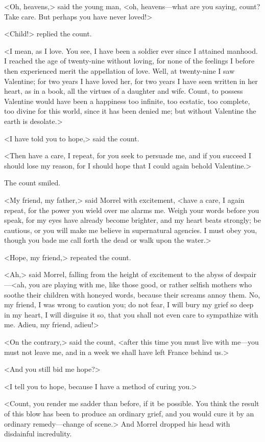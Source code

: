  <Oh, heavens,> said the young man, <oh, heavens—what are you saying, count? Take care. But perhaps you have never loved!> 

 <Child!> replied the count. 

 <I mean, as I love. You see, I have been a soldier ever since I attained manhood. I reached the age of twenty-nine without loving, for none of the feelings I before then experienced merit the appellation of love. Well, at twenty-nine I saw Valentine; for two years I have loved her, for two years I have seen written in her heart, as in a book, all the virtues of a daughter and wife. Count, to possess Valentine would have been a happiness too infinite, too ecstatic, too complete, too divine for this world, since it has been denied me; but without Valentine the earth is desolate.> 

 <I have told you to hope,> said the count. 

 <Then have a care, I repeat, for you seek to persuade me, and if you succeed I should lose my reason, for I should hope that I could again behold Valentine.> 

 The count smiled. 

 <My friend, my father,> said Morrel with excitement, <have a care, I again repeat, for the power you wield over me alarms me. Weigh your words before you speak, for my eyes have already become brighter, and my heart beats strongly; be cautious, or you will make me believe in supernatural agencies. I must obey you, though you bade me call forth the dead or walk upon the water.> 

 <Hope, my friend,> repeated the count. 

 <Ah,> said Morrel, falling from the height of excitement to the abyss of despair—<ah, you are playing with me, like those good, or rather selfish mothers who soothe their children with honeyed words, because their screams annoy them. No, my friend, I was wrong to caution you; do not fear, I will bury my grief so deep in my heart, I will disguise it so, that you shall not even care to sympathize with me. Adieu, my friend, adieu!> 

 <On the contrary,> said the count, <after this time you must live with me—you must not leave me, and in a week we shall have left France behind us.> 

 <And you still bid me hope?> 

 <I tell you to hope, because I have a method of curing you.> 

 <Count, you render me sadder than before, if it be possible. You think the result of this blow has been to produce an ordinary grief, and you would cure it by an ordinary remedy—change of scene.> And Morrel dropped his head with disdainful incredulity. 

